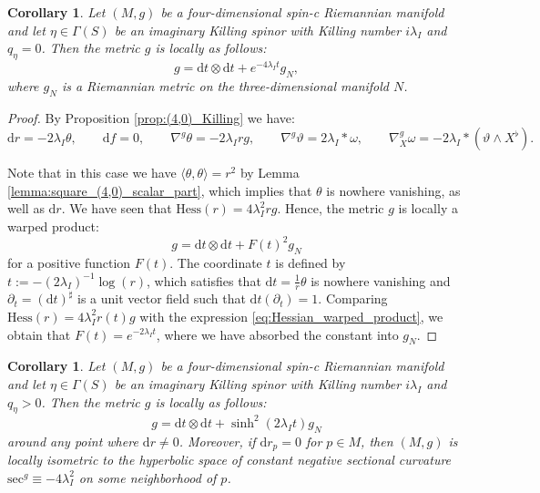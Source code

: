 \documentclass[10pt,a4paper,twoside,reqno]{amsart}
\theoremstyle{plain}
\newtheorem{cor}[thm]{Corollary}
\theoremstyle{definition}
\theoremstyle{remark}
\def\dd{\mathrm{d}}
\def\dd{\mathrm{d}}
\newcommand{\escal}[1]{\langle#1\rangle}
\def\Hess{\mathrm{Hess}}
\begin{document}
\begin{cor}
    Let $(M,g)$ be a four-dimensional spin-c Riemannian manifold and let $\eta\in\Gamma(S)$ be an imaginary Killing spinor with Killing number $i\lambda_I$ and $q_\eta=0$. Then the metric $g$ is locally as follows: $$g=\dd t\otimes\dd t+e^{-4\lambda_It}g_N,$$ where $g_N$ is a Riemannian metric on the three-dimensional manifold $N$.
\end{cor}

\begin{proof}
    By Proposition \ref{prop:(4,0)_Killing} we have: $$\dd r=-2\lambda_I\theta,\qquad \dd f=0,\qquad \nabla^g\theta=-2\lambda_Irg,\qquad \nabla^g\vartheta=2\lambda_I*\omega,\qquad \nabla^g_X\omega=-2\lambda_I*(\vartheta\wedge X^\flat).$$

    Note that in this case we have $\escal{\theta,\theta}=r^2$ by Lemma \ref{lemma:square_(4,0)_scalar_part}, which implies that $\theta$ is nowhere vanishing, as well as $\dd r$. We have seen that $\Hess(r)=4\lambda_I^2rg$. Hence, the metric $g$ is locally a warped product: $$g=\dd t\otimes\dd t+F(t)^2g_N$$ for a positive function $F(t)$. The coordinate $t$ is defined by $t:=-(2\lambda_I)^{-1}\log(r)$, which satisfies that $\dd t=\frac{1}{r}\theta$ is nowhere vanishing and $\partial_t=(\dd t)^\sharp$ is a unit vector field such that $\dd t(\partial_t)=1$. Comparing $\Hess(r)=4\lambda_I^2r(t)g$ with the expression \eqref{eq:Hessian_warped_product}, we obtain that $F(t)=e^{-2\lambda_It}$, where we have absorbed the constant into $g_N$.
\end{proof}

\begin{cor}
    Let $(M,g)$ be a four-dimensional spin-c Riemannian manifold and let $\eta\in\Gamma(S)$ be an imaginary Killing spinor with Killing number $i\lambda_I$ and $q_\eta>0$. Then the metric $g$ is locally as follows: $$g=\dd t\otimes\dd t+\sinh^2(2\lambda_It)g_N$$ around any point where $\dd r\neq0$. Moreover, if $\dd r_p=0$ for $p\in M$, then $(M,g)$ is locally isometric to the hyperbolic space of constant negative sectional curvature $\mathrm{sec}^g\equiv-4\lambda_I^2$ on some neighborhood of $p$.
\end{cor}
\end{document}
